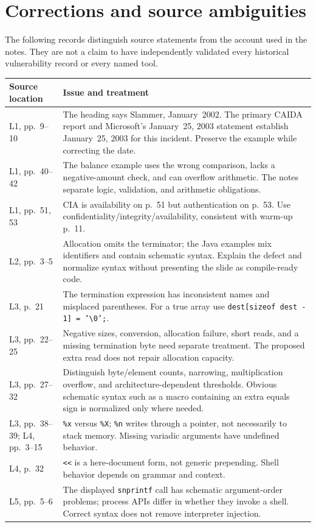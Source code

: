\documentclass[11pt,a4paper]{article}
\newcommand{\currentmodule}{Contents}
\newcommand{\module}[2]{\par\Needspace{8\baselineskip}\gdef\currentmodule{#1}\section{#1}\label{#2}}
\numberwithin{figure}{section}
\begin{document}
\appendix
\module{Corrections and source ambiguities}{app:corrections}
The following records distinguish source statements from the account used in the notes. They are not a claim to have independently validated every historical vulnerability record or every named tool.
\begin{longtable}{@{}>{\raggedright\arraybackslash}p{26mm}>{\raggedright\arraybackslash}p{123mm}@{}}
\toprule Source location & Issue and treatment\\\midrule\endhead
L1, pp.~9--10 & The heading says Slammer, January~2002. The primary CAIDA report and Microsoft's January~25, 2003 statement establish January~25, 2003 for this incident. Preserve the example while correcting the date.\\
L1, pp.~40--42 & The balance example uses the wrong comparison, lacks a negative-amount check, and can overflow arithmetic. The notes separate logic, validation, and arithmetic obligations.\\
L1, pp.~51, 53 & CIA is availability on p.~51 but authentication on p.~53. Use confidentiality/integrity/availability, consistent with warm-up p.~11.\\
L2, pp.~3--5 & Allocation omits the terminator; the Java examples mix identifiers and contain schematic syntax. Explain the defect and normalize syntax without presenting the slide as compile-ready code.\\
L3, p.~21 & The termination expression has inconsistent names and misplaced parentheses. For a true array use \texttt{dest[sizeof dest - 1] = '\textbackslash{}0';}.\\
L3, pp.~22--25 & Negative sizes, conversion, allocation failure, short reads, and a missing termination byte need separate treatment. The proposed extra read does not repair allocation capacity.\\
L3, pp.~27--32 & Distinguish byte/element counts, narrowing, multiplication overflow, and architecture-dependent thresholds. Obvious schematic syntax such as a macro containing an extra equals sign is normalized only where needed.\\
L3, pp.~38--39; L4, pp.~3--15 & \texttt{\%x} versus \texttt{\%X}; \texttt{\%n} writes through a pointer, not necessarily to stack memory. Missing variadic arguments have undefined behavior.\\
L4, p.~32 & \texttt{<<} is a here-document form, not generic prepending. Shell behavior depends on grammar and context.\\
L5, pp.~5--6 & The displayed \texttt{snprintf} call has schematic argument-order problems; process APIs differ in whether they invoke a shell. Correct syntax does not remove interpreter injection.\\

\end{longtable}
\end{document}
